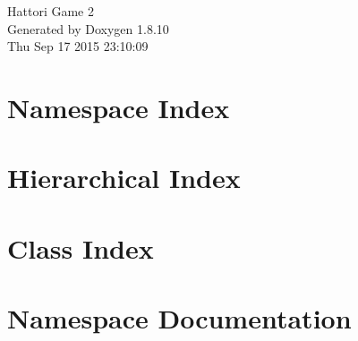 \documentclass[twoside]{book}
\newcommand{\+}{\discretionary{\mbox{\scriptsize$\hookleftarrow$}}{}{}}
\newcommand{\clearemptydoublepage}{%
  \newpage{\pagestyle{empty}\cleardoublepage}%
}
\begin{document}
\hypersetup{pageanchor=false,
             bookmarks=true,
             bookmarksnumbered=true,
             pdfencoding=unicode
            }
\begin{titlepage}
\vspace*{7cm}
\begin{center}%
{\Large Hattori Game 2 }\\
\vspace*{1cm}
{\large Generated by Doxygen 1.8.10}\\
\vspace*{0.5cm}
{\small Thu Sep 17 2015 23:10:09}\\
\end{center}
\end{titlepage}
\clearemptydoublepage
\tableofcontents
\clearemptydoublepage
{}
\hypersetup{pageanchor=true}

\chapter{Namespace Index}

\chapter{Hierarchical Index}

\chapter{Class Index}

\chapter{Namespace Documentation}






\end{document}
